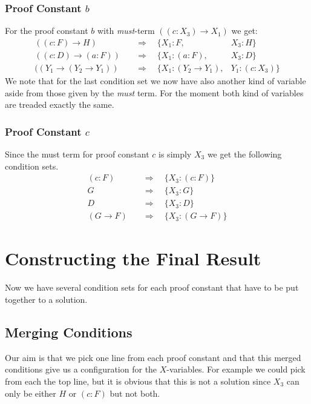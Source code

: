 \subsubsection[look up proof constant b]{Proof Constant $b$}
For the proof constant $b$ with \emph{must}-term $((c:X_3) \rightarrow X_1)$ we get:
\begin{align}
	((c:F) \rightarrow H) & \quad \Rightarrow \quad \{X_1: F, & X_3: H\}\\ 
	((c:D) \rightarrow (a:F)) & \quad \Rightarrow \quad \{X_1: (a:F), & X_3: D\}\\ 
	((Y_1 \rightarrow (Y_2 \rightarrow Y_1)) & \quad \Rightarrow \quad \{X_1: (Y_2 \rightarrow Y_1), & Y_1: (c:X_3)\} \label{condition:b}
\end{align}
We note that for the last condition set we now have also another kind of variable aside from those given by the \emph{must} term. For the moment both kind of variables are treaded exactly the same.

\subsubsection[look up proof constant c]{Proof Constant $c$}
Since the must term for proof constant $c$ is simply $X_3$ we get the following condition sets.
\begin{align}
	(c:F) & \quad \Rightarrow \quad \{X_3: (c:F)\} \\ 
	G & \quad \Rightarrow \quad \{X_3: G\} \\ 
	D & \quad \Rightarrow \quad \{X_3: D\}\label{condition:c} \\ 
	(G \rightarrow F) & \quad \Rightarrow \quad \{X_3: (G \rightarrow F)\} 
\end{align}

\section{Constructing the Final Result}
Now we have several condition sets for each proof constant that have to be put together to a solution.
\subsection{Merging Conditions}
Our aim is that we pick one line from each proof constant and that this merged conditions give us a configuration for the $X$-variables. For example we could pick from each the top line, but it is obvious that this is not a solution since $X_3$ can only be either $H$ or $(c:F)$ but not both.

